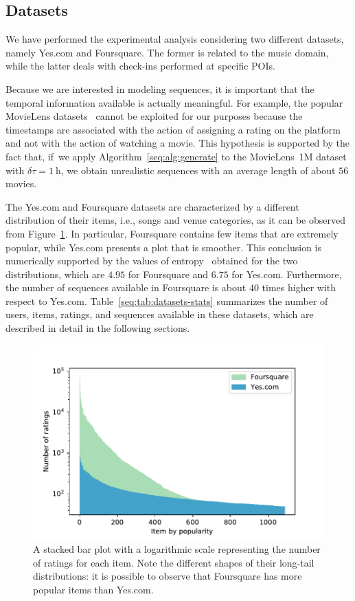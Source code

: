 \subsection{Datasets}
\label{seq:sec:datasets}

We have performed the experimental analysis considering two different datasets, namely Yes.com and Foursquare. The former is related to the music domain, while the latter deals with check-ins performed at specific POIs.

Because we are interested in modeling sequences, it is important that the temporal information available is actually meaningful. For example, the popular MovieLens datasets~\cite{Harper2015} cannot be exploited for our purposes because the timestamps are associated with the action of assigning a rating on the platform and not with the action of watching a movie. This hypothesis is supported by the fact that, if~we apply Algorithm~\ref{seq:alg:generate} to the MovieLens~1M dataset with $\delta \tau = 1\ \mathrm{h}$, we obtain unrealistic sequences with an average length of about $56$ movies.

The Yes.com and Foursquare datasets are characterized by a different distribution of their items, i.e., songs and venue categories, as it can be observed from Figure~\ref{seq:fig:datasets-barplot}. In particular, Foursquare contains few items that are extremely popular, while Yes.com presents a plot that is smoother. This conclusion is numerically supported by the values of entropy~\cite{Shannon1948} obtained for the two distributions, which are $4.95$ for Foursquare and $6.75$ for Yes.com. Furthermore, the number of sequences available in Foursquare is about $40$ times higher with respect to Yes.com. Table~\ref{seq:tab:datasets-stats} summarizes the number of users, items, ratings, and sequences available in these datasets, which are described in detail in the following sections.

\begin{figure}
\centering
\includegraphics[width=.9\textwidth]{datasets_barplot.pdf}
\caption[Number of ratings per item]{A stacked bar plot with a logarithmic scale representing the number of ratings for each item. Note the different shapes of their long-tail distributions: it is possible to observe that Foursquare has more popular items than Yes.com.}
\label{seq:fig:datasets-barplot}
\end{figure}

